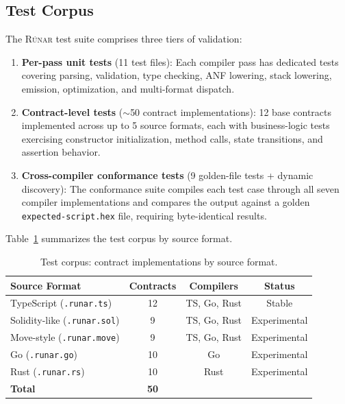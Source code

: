 \documentclass[11pt,a4paper]{article}
\newcommand{\runar}{\textsc{Rúnar}}
\begin{document}
\subsection{Test Corpus}
\label{sec:eval-corpus}

The \runar{} test suite comprises three tiers of validation:

\begin{enumerate}[nosep]
  \item \textbf{Per-pass unit tests} (11 test files): Each compiler pass has
    dedicated tests covering parsing, validation, type checking, ANF lowering,
    stack lowering, emission, optimization, and multi-format dispatch.
  \item \textbf{Contract-level tests} ($\sim$50 contract implementations):
    12 base contracts implemented across up to 5 source formats, each with
    business-logic tests exercising constructor initialization, method calls,
    state transitions, and assertion behavior.
  \item \textbf{Cross-compiler conformance tests} (9 golden-file tests +
    dynamic discovery): The conformance suite compiles each test case through
    all seven compiler implementations and compares the output against a
    golden \texttt{expected-script.hex} file, requiring byte-identical results.
\end{enumerate}

Table~\ref{tab:corpus} summarizes the test corpus by source format.

\begin{table}[h]
\centering
\small
\begin{tabular}{@{}lccc@{}}
\toprule
\textbf{Source Format} & \textbf{Contracts} & \textbf{Compilers} & \textbf{Status} \\
\midrule
TypeScript (\texttt{.runar.ts}) & 12 & TS, Go, Rust & Stable \\
Solidity-like (\texttt{.runar.sol}) & 9 & TS, Go, Rust & Experimental \\
Move-style (\texttt{.runar.move}) & 9 & TS, Go, Rust & Experimental \\
Go (\texttt{.runar.go}) & 10 & Go & Experimental \\
Rust (\texttt{.runar.rs}) & 10 & Rust & Experimental \\
\midrule
\textbf{Total} & \textbf{50} & & \\
\bottomrule
\end{tabular}
\caption{Test corpus: contract implementations by source format.}
\label{tab:corpus}
\end{table}
\end{document}
